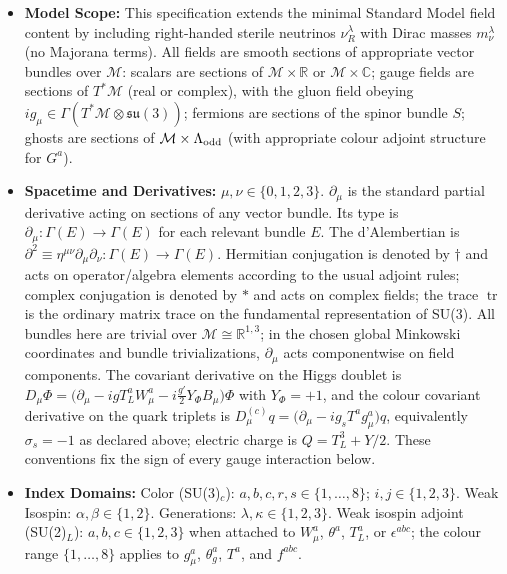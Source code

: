 \documentclass{article}
\begin{document}
\begin{itemize}
    \item \textbf{Model Scope:} This specification extends the minimal Standard Model field content by including right-handed sterile neutrinos $\nu_R^\lambda$ with Dirac masses $m_\nu^\lambda$ (no Majorana terms). All fields are smooth sections of appropriate vector bundles over $\mathcal M$: scalars are sections of $\mathcal M\times\mathbb R$ or $\mathcal M\times\mathbb C$; gauge fields are sections of $T^*\mathcal M$ (real or complex), with the gluon field obeying $i g_\mu \in \Gamma(T^*\mathcal M\otimes\mathfrak{su}(3))$; fermions are sections of the spinor bundle $S$; ghosts are sections of $\mathcal M\times\Lambda_{\rm odd}$ (with appropriate colour adjoint structure for $G^a$).
    \item \textbf{Spacetime and Derivatives:} $\mu, \nu \in \{0, 1, 2, 3\}$. $\partial_\mu$ is the standard partial derivative acting on sections of any vector bundle. Its type is $\partial_\mu : \Gamma(E) \to \Gamma(E)$ for each relevant bundle $E$. The d'Alembertian is $\partial^2 \equiv \eta^{\mu\nu}\partial_\mu\partial_\nu : \Gamma(E) \to \Gamma(E)$. Hermitian conjugation is denoted by $\dagger$ and acts on operator/algebra elements according to the usual adjoint rules; complex conjugation is denoted by $*$ and acts on complex fields; the trace $\operatorname{tr}$ is the ordinary matrix trace on the fundamental representation of SU(3).
    All bundles here are trivial over $\mathcal M \cong \mathbb{R}^{1,3}$; in the chosen global Minkowski coordinates and bundle trivializations, $\partial_\mu$ acts componentwise on field components.
    The covariant derivative on the Higgs doublet is $D_\mu \Phi = \big(\partial_\mu - i g T_L^a W_\mu^a - i \tfrac{g'}{2} Y_\Phi B_\mu\big)\Phi$ with $Y_\Phi = +1$, and the colour covariant derivative on the quark triplets is $D_\mu^{(c)} q = \big(\partial_\mu - i g_s T^a g_\mu^a\big) q$, equivalently $\sigma_s = -1$ as declared above; electric charge is $Q = T_L^3 + Y/2$. These conventions fix the sign of every gauge interaction below.
    \item \textbf{Index Domains:} 
    Color (SU(3)$_c$): $a, b, c, r, s \in \{1, \dots, 8\}$; $i, j \in \{1, 2, 3\}$. 
    Weak Isospin: $\alpha, \beta \in \{1, 2\}$. 
    Generations: $\lambda, \kappa \in \{1, 2, 3\}$.
    Weak isospin adjoint (SU(2)$_L$): $a,b,c \in \{1,2,3\}$ when attached to $W_\mu^a$, $\theta^a$, $T_L^a$, or $\epsilon^{abc}$; the colour range $\{1,\dots,8\}$ applies to $g_\mu^a$, $\theta_g^a$, $T^a$, and $f^{abc}$.

\end{itemize}
\end{document}
